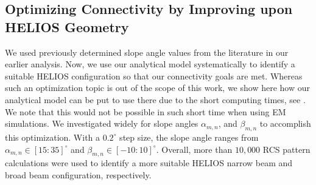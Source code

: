 \subsection{Optimizing Connectivity by Improving upon HELIOS Geometry}\label{Optimizing the HELIOS Geometry for Better Performance}
We used previously determined slope angle values from the literature \cite{Helios} in our earlier analysis. Now, we use our analytical model systematically to identify a suitable HELIOS configuration so that our connectivity goals are met. Whereas such an optimization topic is out of the scope of this work, we show here how our analytical model can be put to use there due to the short computing times, see . We note that this would not be possible in such short time when using EM simulations. We investigated widely for slope angles $\alpha_{m,n}$, and $\beta_{m,n}$ to accomplish this optimization. With a $\num{0.2}^\circ$ step size, the slope angle ranges from $\alpha_{m,n} \in [15: 35]^\circ$ and $\beta_{m,n} \in [-10: 10]^\circ$. Overall, more than $10,000$ RCS pattern calculations were used to identify a more suitable HELIOS narrow beam and broad beam configuration, respectively.

